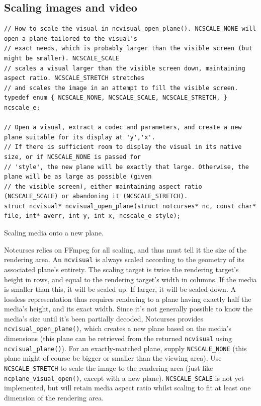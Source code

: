 \documentclass[letterpaper,10pt]{article}
\begin{document}
\subsection{Scaling images and video}
\begin{listing}[!htb]
\begin{verbatim}
// How to scale the visual in ncvisual_open_plane(). NCSCALE_NONE will open a plane tailored to the visual's
// exact needs, which is probably larger than the visible screen (but might be smaller). NCSCALE_SCALE
// scales a visual larger than the visible screen down, maintaining aspect ratio. NCSCALE_STRETCH stretches
// and scales the image in an attempt to fill the visible screen.
typedef enum { NCSCALE_NONE, NCSCALE_SCALE, NCSCALE_STRETCH, } ncscale_e;

// Open a visual, extract a codec and parameters, and create a new plane suitable for its display at 'y','x'.
// If there is sufficient room to display the visual in its native size, or if NCSCALE_NONE is passed for
// 'style', the new plane will be exactly that large. Otherwise, the plane will be as large as possible (given
// the visible screen), either maintaining aspect ratio (NCSCALE_SCALE) or abandoning it (NCSCALE_STRETCH).
struct ncvisual* ncvisual_open_plane(struct notcurses* nc, const char* file, int* averr, int y, int x, ncscale_e style);
\end{verbatim}
\caption{Scaling media onto a new plane.}
\label{list:scaling}
\end{listing}
Notcurses relies on FFmpeg for all scaling, and thus must tell it the size of
the rendering area. An \texttt{ncvisual} is always scaled according to the
geometry of its associated plane's entirety. The scaling target is twice the
rendering target's height in rows, and equal to the rendering target's width in
columns. If the media is smaller than this, it will be scaled up. If larger, it
will be scaled down. A lossless representation thus requires rendering to a
plane having exactly half the media's height, and its exact width. Since it's
not generally possible to know the media's size until it's been partially
decoded, Notcurses provides \texttt{ncvisual\_open\_plane()}, which creates
a new plane based on the media's dimensions (this plane can be retrieved from
the returned \texttt{ncvisual} using \texttt{ncvisual\_plane()}). For an
exactly-matched plane, supply \texttt{NCSCALE\_NONE} (this plane might of course
be bigger or smaller than the viewing area). Use \texttt{NCSCALE\_STRETCH} to
scale the image to the rendering area (just like \texttt{ncplane\_visual\_open()},
except with a new plane). \texttt{NCSCALE\_SCALE} is not yet implemented, but
will retain media aspect ratio whilst scaling to fit at least one dimension
of the rendering area.
\end{document}
